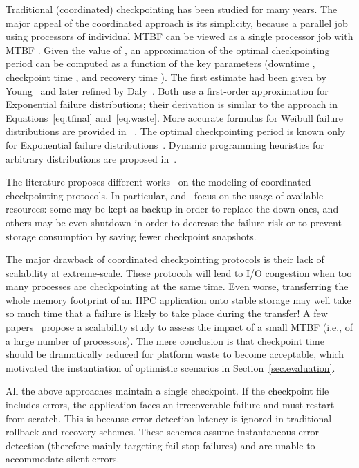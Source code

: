 \documentclass[10pt,table]{article}
\begin{document}
Traditional (coordinated) checkpointing has been studied for many
years.  The major appeal of the coordinated approach is its
simplicity, because a parallel job using  processors of individual
MTBF  can be viewed as a single processor job with MTBF
. Given the value of , an approximation of
the optimal checkpointing period can be computed as a function of the
key parameters (downtime , checkpoint time ,
and recovery time ). The first estimate had been given by
Young~\cite{young74} and later refined by Daly~\cite{daly04}. Both
use a first-order approximation for Exponential failure
distributions; their derivation is similar to the approach in
Equations~\eqref{eq.tfinal} and~\eqref{eq.waste}.  More accurate
formulas for Weibull failure distributions are provided in
~\cite{ling2001variational,ozaki2006distribution,doi:10.1007/978-3-642-14390-8_22}.
The optimal checkpointing period is known only for Exponential failure
distributions~\cite{c178}.  Dynamic programming heuristics for
arbitrary distributions are proposed
in~\cite{toueg1983optimum,10.1109/TC.2012.57,c178}.

The literature proposes different
works~\cite{Plank01processorallocation,SunICPP10,Wang_DSN05,4367962,5289177}
on the modeling of coordinated checkpointing
protocols. In particular,  \cite{SunICPP10} and~\cite{Plank01processorallocation}
focus on the usage of available resources: some may be kept as backup
in order to replace the down ones, and others may be even shutdown in
order to decrease the failure risk or to prevent storage consumption
by saving fewer checkpoint snapshots.

The major drawback of coordinated checkpointing protocols is their
lack of scalability at extreme-scale.  These protocols will lead to
I/O congestion when too many processes are checkpointing at the same
time. Even worse, transferring the whole memory footprint of an HPC
application onto stable storage may well take so much time that a
failure is likely to take place during the transfer!  A few
papers~\cite{5289177,j116} propose a scalability study to assess the
impact of a small MTBF (i.e., of a large number of
processors). The mere conclusion is that checkpoint time should be
dramatically reduced for platform waste to become
acceptable, which motivated the instantiation of optimistic scenarios in
Section~\ref{sec.evaluation}.

All the above approaches maintain a single checkpoint. If the checkpoint file includes errors, the application 
faces an irrecoverable failure and must restart from scratch. This is because error 
detection latency is ignored in traditional rollback and recovery schemes. These schemes
assume instantaneous error detection (therefore mainly targeting fail-stop failures)
and are unable to accommodate silent errors.
\end{document}
